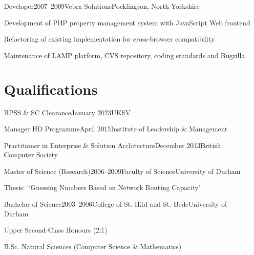 \documentclass{cv}
\begin{document}

\begin{experience}{Developer}{2007--2009}{Vebra Solutions}{Pocklington, North Yorkshire}
\item Development of PHP property management system with JavaScript Web frontend
\item Refactoring of existing implementation for cross-browser compatibility
\item Maintenance of LAMP platform, CVS repository, coding standards and Bugzilla
\end{experience}


\section{Qualifications}

\begin{experienceplain}{BPSS \& SC Clearance}{January 2023}{UKSV}{}
\end{experienceplain}

\begin{experienceplain}{Manager HD Programme}{April 2015}{Institute of Leadership \& Management}{}
\end{experienceplain}

\begin{experienceplain}{Practitioner in Enterprise \& Solution Architecture}{December 2013}{British Computer Society}{}
\end{experienceplain}

\begin{experience}{Master of Science (Research)}{2006--2009}{Faculty of Science}{University of Durham}
\item Thesis: ``Guessing Numbers Based on Network Routing Capacity"
\end{experience}

\begin{experience}{Bachelor of Science}{2003--2006}{College of St. Hild and St. Bede}{University of Durham}
\item Upper Second-Class Honours (2:1)
\item B.Sc. Natural Sciences (Computer Science \& Mathematics)
\end{experience}
\end{document}
